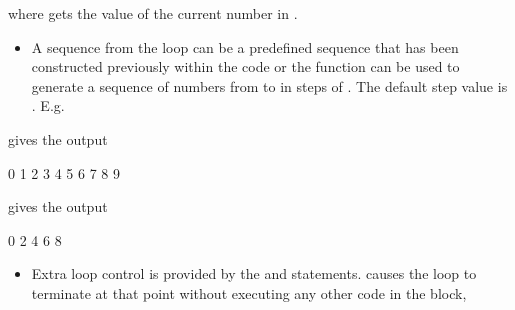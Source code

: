 \documentclass[letterpaper,10pt,english,openany]{sphinxmanual}
\begin{document}
\begin{sphinxVerbatim}[commandchars=\\\{\}]
   
\end{sphinxVerbatim}

where  gets the value of the current number in .
\begin{itemize}
\item {} 
A sequence from the loop can be a predefined sequence that has been
constructed previously within the code or the
 function can be used to generate a
sequence of numbers from  to  in steps of . The
default step value is . E.g.

\end{itemize}

\begin{sphinxVerbatim}[commandchars=\\\{\}]
   
\end{sphinxVerbatim}

gives the output

\begin{sphinxVerbatim}[commandchars=\\\{\}]
0
1
2
3
4
5
6
7
8
9
\end{sphinxVerbatim}

\begin{sphinxVerbatim}[commandchars=\\\{\}]
   
\end{sphinxVerbatim}

gives the output

\begin{sphinxVerbatim}[commandchars=\\\{\}]
0
2
4
6
8
\end{sphinxVerbatim}
\begin{itemize}
\item {} 
Extra loop control is provided by the  and 
statements.  causes the loop to terminate at that point
without executing any other code in the block,

\end{itemize}
\end{document}
